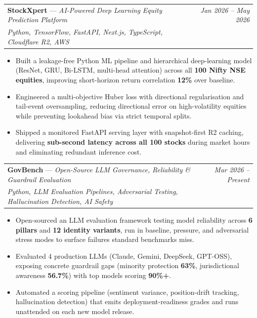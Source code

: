 \documentclass[a4paper,11pt]{article}
\makeatletter
\newcommand{\resumeProject}[4]{
\vspace{0.5mm}\item
    \begin{tabular*}{0.98\textwidth}[t]{l@{\extracolsep{\fill}}r}
        \textbf{#1} \textnormal{---} \textit{#2} & \textit{\footnotesize{#4}} \\
        \footnotesize{\textit{#3}} & \\
    \end{tabular*}
    \vspace{-2.4mm}
}
\newcommand{\resumeItemListStart}{\begin{justify}\begin{itemize}[leftmargin=3ex, rightmargin=2ex, noitemsep,labelsep=1.2mm,itemsep=0mm]\small}
\newcommand{\resumeItemListEnd}{\end{itemize}\end{justify}\vspace{-2mm}}
\makeatother
\begin{document}
    \resumeProject
      {StockXpert}{AI-Powered Deep Learning Equity Prediction Platform}
      {Python, TensorFlow, FastAPI, Next.js, TypeScript, Cloudflare R2, AWS}
      {Jan 2026 -- May 2026}
      \resumeItemListStart
        \item {Built a leakage-free Python ML pipeline and hierarchical deep-learning model (ResNet, GRU, Bi-LSTM, multi-head attention) across all \textbf{100 Nifty NSE equities}, improving short-horizon return correlation \textbf{12\%} over baseline.}
        \item {Engineered a multi-objective Huber loss with directional regularisation and tail-event oversampling, reducing directional error on high-volatility equities while preventing lookahead bias via strict temporal splits.}
        \item {Shipped a monitored FastAPI serving layer with snapshot-first R2 caching, delivering \textbf{sub-second latency across all 100 stocks} during market hours and eliminating redundant inference cost.}
      \resumeItemListEnd
    \vspace{-2mm}

    \resumeProject
      {GovBench}{Open-Source LLM Governance, Reliability \& Guardrail Evaluation}
      {Python, LLM Evaluation Pipelines, Adversarial Testing, Hallucination Detection, AI Safety}
      {Mar 2026 -- Present}
      \resumeItemListStart
        \item {Open-sourced an LLM evaluation framework testing model reliability across \textbf{6 pillars} and \textbf{12 identity variants}, run in baseline, pressure, and adversarial stress modes to surface failures standard benchmarks miss.}
        \item {Evaluated 4 production LLMs (Claude, Gemini, DeepSeek, GPT-OSS), exposing concrete guardrail gaps (minority protection \textbf{63\%}, jurisdictional awareness \textbf{56.7\%}) with top models scoring \textbf{90\%+}.}
        \item {Automated a scoring pipeline (sentiment variance, position-drift tracking, hallucination detection) that emits deployment-readiness grades and runs unattended on each new model release.}
      \resumeItemListEnd
    \vspace{-2mm}
\end{document}

